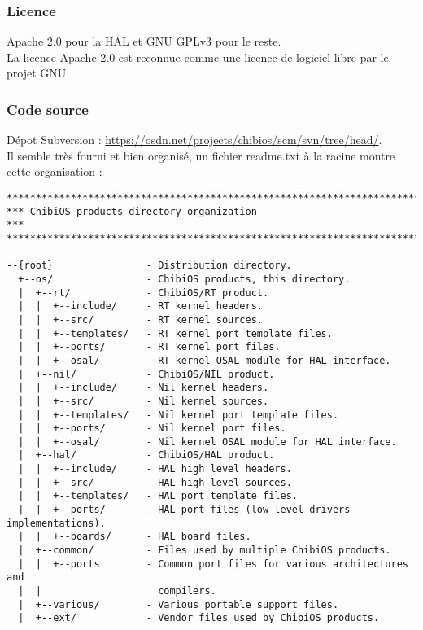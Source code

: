 \subsubsection{Licence}
Apache 2.0 pour la HAL et GNU GPLv3 pour le reste.\\

La licence Apache 2.0 est reconnue comme une licence de logiciel libre par le projet
GNU \cite{ref2}

\subsubsection{Code source}
Dépot Subversion : \url{https://osdn.net/projects/chibios/scm/svn/tree/head/}.\\

Il semble très fourni et bien organisé, un fichier readme.txt à la racine montre
cette organisation :
\begin{verbatim}
*****************************************************************************
*** ChibiOS products directory organization                               ***
*****************************************************************************

--{root}                - Distribution directory.
  +--os/                - ChibiOS products, this directory.
  |  +--rt/             - ChibiOS/RT product.
  |  |  +--include/     - RT kernel headers.
  |  |  +--src/         - RT kernel sources.
  |  |  +--templates/   - RT kernel port template files.
  |  |  +--ports/       - RT kernel port files.
  |  |  +--osal/        - RT kernel OSAL module for HAL interface.
  |  +--nil/            - ChibiOS/NIL product.
  |  |  +--include/     - Nil kernel headers.
  |  |  +--src/         - Nil kernel sources.
  |  |  +--templates/   - Nil kernel port template files.
  |  |  +--ports/       - Nil kernel port files.
  |  |  +--osal/        - Nil kernel OSAL module for HAL interface.
  |  +--hal/            - ChibiOS/HAL product.
  |  |  +--include/     - HAL high level headers.
  |  |  +--src/         - HAL high level sources.
  |  |  +--templates/   - HAL port template files.
  |  |  +--ports/       - HAL port files (low level drivers implementations).
  |  |  +--boards/      - HAL board files.
  |  +--common/         - Files used by multiple ChibiOS products.
  |  |  +--ports        - Common port files for various architectures and
  |  |                    compilers.
  |  +--various/        - Various portable support files.
  |  +--ext/            - Vendor files used by ChibiOS products.
\end{verbatim}

